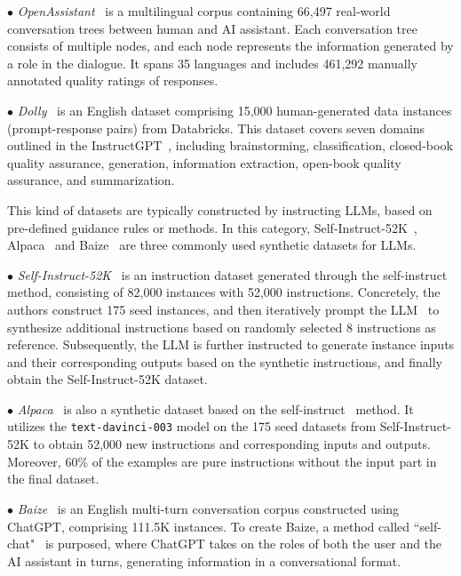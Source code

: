 {{{{$\bullet$ \emph{OpenAssistant}{~\cite{kopf-arxiv-2023-openassistant} is a multilingual corpus containing 66,497 real-world conversation trees between human and AI assistant. Each conversation tree consists of multiple nodes, and each node represents the information generated by a role in the dialogue.
It spans 35 languages and includes 461,292 manually annotated quality ratings of responses. }

$\bullet$ \emph{Dolly}{~\cite{Conover-2023-arxiv-Dolly} is an English dataset comprising 15,000 human-generated data instances (prompt-response pairs) from Databricks.  
This dataset covers seven domains outlined in the InstructGPT~\cite{Ouyang-arxiv-2022-Training}, including brainstorming, classification, closed-book quality assurance, generation, information extraction, open-book quality assurance, and summarization. }

 {This kind of datasets are typically constructed  by instructing  LLMs, based on pre-defined guidance rules or methods.
In this category, 
Self-Instruct-52K~\cite{Wang-arXiv-2022-Self}, Alpaca~\cite{Taori-github-2023-Stanford} and Baize~\cite{xu-arxiv-2023-baize} are three commonly used synthetic datasets for LLMs.}

$\bullet$ \emph{Self-Instruct-52K}~\cite{Wang-arXiv-2022-Self} is an instruction dataset generated through the self-instruct~\cite{Wang-arXiv-2022-Self} method, consisting of 82,000 instances with 52,000 instructions. Concretely, the authors construct 175 seed instances, and then iteratively prompt the LLM~\cite{Brown-NeurIPS-2020-Language} to synthesize additional instructions based on randomly selected 8 instructions as reference. 
Subsequently, the LLM is further instructed  to generate instance inputs and their corresponding outputs based on the synthetic instructions, and finally obtain the Self-Instruct-52K dataset. 

$\bullet$ \emph{Alpaca}~\cite{Taori-github-2023-Stanford} is also a synthetic dataset based on the self-instruct~\cite{Wang-arXiv-2022-Self} method. It utilizes the \texttt{text-davinci-003} model on the 175 seed datasets from Self-Instruct-52K to obtain 52,000 new  instructions and corresponding inputs and outputs. Moreover,  %
60\% of the examples are pure instructions without the input part in the final dataset.

$\bullet$ \emph{Baize}~\cite{xu-arxiv-2023-baize} is an English multi-turn conversation corpus constructed using ChatGPT, comprising 111.5K instances. To create Baize, a method called ``self-chat"~\cite{xu-arxiv-2023-baize} is purposed, where ChatGPT takes on the roles of both the user and the AI assistant in turns, generating information in a conversational format. 

}}}}
